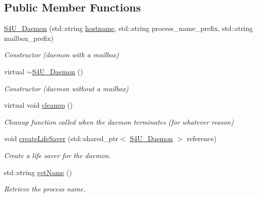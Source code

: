 \subsection*{Public Member Functions}
\begin{DoxyCompactItemize}
\item 
\hyperlink{classwrench_1_1_s4_u___daemon_af63c270457dcf4a48ac9711c1fc2dc2e}{S4\+U\+\_\+\+Daemon} (std\+::string \hyperlink{classwrench_1_1_s4_u___daemon_a52bc0b9a6cd248310749dac086819f00}{hostname}, std\+::string process\+\_\+name\+\_\+prefix, std\+::string mailbox\+\_\+prefix)
\begin{DoxyCompactList}\small\item\em Constructor (daemon with a mailbox) \end{DoxyCompactList}\item 
virtual \hyperlink{classwrench_1_1_s4_u___daemon_ad5196a532f21f892ce5681034cf2c2db}{$\sim$\+S4\+U\+\_\+\+Daemon} ()
\begin{DoxyCompactList}\small\item\em Constructor (daemon without a mailbox) \end{DoxyCompactList}\item 
\mbox{\label{classwrench_1_1_s4_u___daemon_a5ecf133b38ec2652d0241ed7d7157925}} 
virtual void \hyperlink{classwrench_1_1_s4_u___daemon_a5ecf133b38ec2652d0241ed7d7157925}{cleanup} ()
\begin{DoxyCompactList}\small\item\em Cleanup function called when the daemon terminates (for whatever reason) \end{DoxyCompactList}\item 
void \hyperlink{classwrench_1_1_s4_u___daemon_a591abd15d6a27371cb04b7839862cc1b}{create\+Life\+Saver} (std\+::shared\+\_\+ptr$<$ \hyperlink{classwrench_1_1_s4_u___daemon}{S4\+U\+\_\+\+Daemon} $>$ reference)
\begin{DoxyCompactList}\small\item\em Create a life saver for the daemon. \end{DoxyCompactList}\item 
std\+::string \hyperlink{classwrench_1_1_s4_u___daemon_a29626b03bc3ef2483366d3f032e6585d}{get\+Name} ()
\begin{DoxyCompactList}\small\item\em Retrieve the process name. \end{DoxyCompactList}\item 

\end{DoxyCompactItemize}
